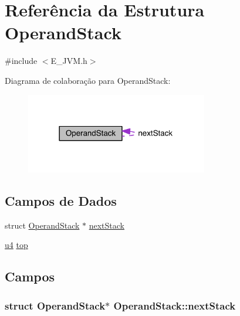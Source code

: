 \hypertarget{struct_operand_stack}{}\section{Referência da Estrutura Operand\+Stack}
\label{struct_operand_stack}


{\ttfamily \#include $<$E\+\_\+\+J\+V\+M.\+h$>$}



Diagrama de colaboração para Operand\+Stack\+:\nopagebreak
\begin{figure}[H]
\begin{center}
\leavevmode
\includegraphics[width=225pt]{struct_operand_stack__coll__graph}
\end{center}
\end{figure}
\subsection*{Campos de Dados}
\begin{DoxyCompactItemize}
\item 
struct \hyperlink{struct_operand_stack}{Operand\+Stack} $\ast$ \hyperlink{struct_operand_stack_a965579f06932f8c57ad8cf660fd0b755}{next\+Stack}
\item 
\hyperlink{_e___j_v_m_8h_aedf6ddc03df8caaaccbb4c60b9a9b850}{u4} \hyperlink{struct_operand_stack_a72c72a798cbb9497d5cec0db07b29dac}{top}
\end{DoxyCompactItemize}


\subsection{Campos}
\hypertarget{struct_operand_stack_a965579f06932f8c57ad8cf660fd0b755}{}
\subsubsection[{next\+Stack}]{\setlength{\rightskip}{0pt plus 5cm}struct {\bf Operand\+Stack}$\ast$ Operand\+Stack\+::next\+Stack}\label{struct_operand_stack_a965579f06932f8c57ad8cf660fd0b755}
\hypertarget{struct_operand_stack_a72c72a798cbb9497d5cec0db07b29dac}{}
